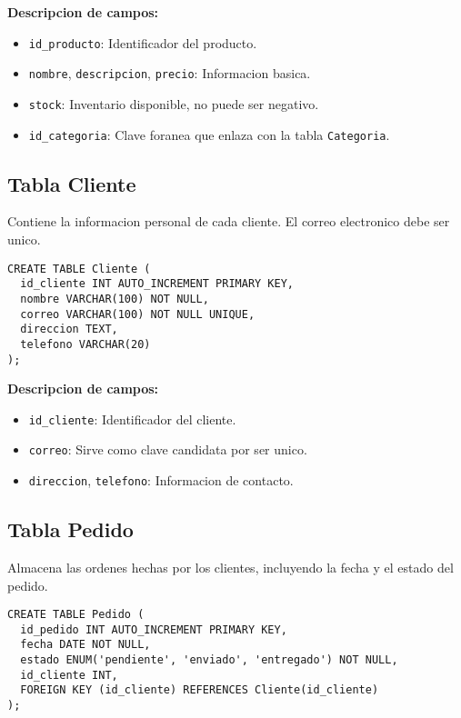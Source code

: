 \textbf{Descripcion de campos:}

\begin{itemize}
  \item \texttt{id\_producto}: Identificador del producto.
  \item \texttt{nombre}, \texttt{descripcion}, \texttt{precio}: Informacion basica.
  \item \texttt{stock}: Inventario disponible, no puede ser negativo.
  \item \texttt{id\_categoria}: Clave foranea que enlaza con la tabla \texttt{Categoria}.
\end{itemize}

\subsection{Tabla Cliente}

Contiene la informacion personal de cada cliente. El correo electronico debe ser unico.

\begin{lstlisting}
CREATE TABLE Cliente (
  id_cliente INT AUTO_INCREMENT PRIMARY KEY,
  nombre VARCHAR(100) NOT NULL,
  correo VARCHAR(100) NOT NULL UNIQUE,
  direccion TEXT,
  telefono VARCHAR(20)
);
\end{lstlisting}

\textbf{Descripcion de campos:}

\begin{itemize}
  \item \texttt{id\_cliente}: Identificador del cliente.
  \item \texttt{correo}: Sirve como clave candidata por ser unico.
  \item \texttt{direccion}, \texttt{telefono}: Informacion de contacto.
\end{itemize}

\subsection{Tabla Pedido}

Almacena las ordenes hechas por los clientes, incluyendo la fecha y el estado del pedido.

\begin{lstlisting}
CREATE TABLE Pedido (
  id_pedido INT AUTO_INCREMENT PRIMARY KEY,
  fecha DATE NOT NULL,
  estado ENUM('pendiente', 'enviado', 'entregado') NOT NULL,
  id_cliente INT,
  FOREIGN KEY (id_cliente) REFERENCES Cliente(id_cliente)
);
\end{lstlisting}

